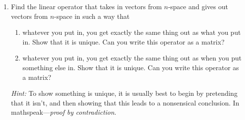 \begin{enumerate}
If all the off-diagonal entries of a matrix vanish, we say that the matrix is diagonal. Let
\[
D=\begin{pmatrix}\lambda&0\\0&\mu\end{pmatrix}\quad \mbox{and}\quad D'=\begin{pmatrix}\lambda'&0\\0&\mu'\end{pmatrix}\, .
\]
Are these matrices diagonal and why? Use the rule you found in problem~\ref{matmult} to compute
the matrix products $DD'$ and $D'D$. What do you observe? Do you think the same property holds for arbitrary matrices? What about products
where only one of the matrices is diagonal?\\

(p.s. Diagonal matrices play a special role in the study of matrices in linear algebra. Keep an eye out for this special role.)

\item \label{idprob} Find the linear operator that takes in vectors from $n$-space and gives out vectors from $n$-space in such a way that 
\begin{enumerate}
\item whatever you put in, you get exactly the same thing out as what you put in. Show that it is unique. Can you write this operator as a matrix? 
\item whatever you put in, you get exactly the same thing out as when you put something else in. Show that it is unique. Can you write this operator as a matrix? 
\end{enumerate}
{\itshape Hint:} To show something is unique, it is usually best to begin by pretending that it isn't, and then showing that this leads to a nonsensical conclusion. In mathspeak---{\itshape proof by contradiction}.



\end{enumerate}
